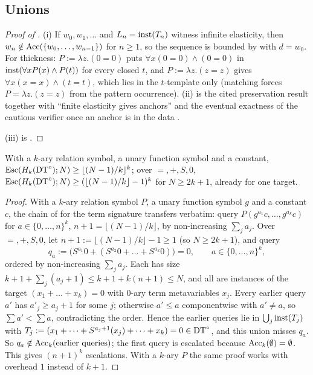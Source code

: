 \subsection{Unions}\label{app:single:unions}

\begin{proof}[Proof of ]
(i) If $w_0,w_1,\dots$ and $L_n=\mathrm{inst}(T_n)$ witness infinite elasticity, then $w_n\notin\mathrm{Acc}(\{w_0,\dots,w_{n-1}\})$ for $n\ge1$, so the sequence is bounded by  with $d=w_0$. For thickness: $P:=\lambda z.(0=0)$ puts $\forall x(0=0)\wedge(0=0)$ in $\mathrm{inst}(\forall xP(x)\wedge P(t))$ for every closed $t$, and $P:=\lambda z.(z=z)$ gives $\forall x(x=x)\wedge(t=t)$, which lies in the $t$-template only (matching forces $P=\lambda z.(z=z)$ from the pattern occurrence). (ii) is the cited preservation result together with ``finite elasticity gives anchors'' and the eventual exactness of the cautious verifier once an anchor is in the data \citep{claude2026whatfollows}.

(iii) is .
\end{proof}

\begin{proposition}\label{prop:single:union-esc}
With a $k$-ary relation symbol, a unary function symbol and a constant, $\mathrm{Esc}(H_k(\mathrm{DT}^{\circ});N)\ge\lfloor(N-1)/k\rfloor^k$; over $=,+,S,0$, $\mathrm{Esc}(H_k(\mathrm{DT}^{\circ});N)\ge(\lfloor(N-1)/k\rfloor-1)^k$ for $N\ge2k+1$, already for one target.
\end{proposition}

\begin{proof}
With a $k$-ary relation symbol $P$, a unary function symbol $g$ and a constant $c$, the chain of \citet{claude2026whatfollows} for the term signature transfers verbatim: query $P(g^{a_1}c,\allowbreak\dots,g^{a_k}c)$ for $a\in\{0,\dots,n\}^k$, $n+1=\lfloor(N-1)/k\rfloor$, by non-increasing $\sum_ja_j$. Over $=,+,S,0$, let $n+1:=\lfloor(N-1)/k\rfloor-1\ge1$ (so $N\ge2k+1$), and query
\[
q_a:=\bigl(S^{a_1}0+(S^{a_2}0+\dots+S^{a_k}0)\bigr)=0,\qquad a\in\{0,\dots,n\}^k,
\]
ordered by non-increasing $\sum_ja_j$. Each has size $k+1+\sum_j(a_j+1)\le k+1+k(n+1)\le N$, and all are instances of the target $(x_1+\dots+x_k)=0$ with $0$-ary term metavariables $x_j$. Every earlier query $a'$ has $a'_j\ge a_j+1$ for some $j$; otherwise $a'\le a$ componentwise with $a'\neq a$, so $\sum a'<\sum a$, contradicting the order. Hence the earlier queries lie in $\bigcup_j\mathrm{inst}(T_j)$ with $T_j:=(x_1+\dots+S^{a_j+1}(x_j)+\dots+x_k)=0\in\mathrm{DT}^{\circ}$, and this union misses $q_a$. So $q_a\notin\mathrm{Acc}_k(\text{earlier queries})$; the first query is escalated because $\mathrm{Acc}_k(\emptyset)=\emptyset$. This gives $(n+1)^k$ escalations. With a $k$-ary $P$ the same proof works with overhead $1$ instead of $k+1$.
\end{proof}

